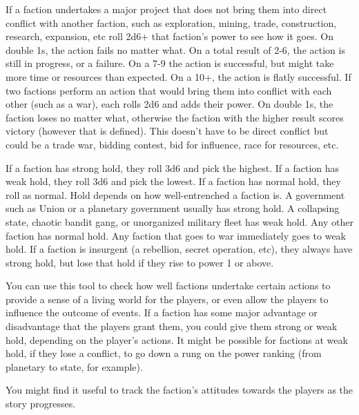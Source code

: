 If a faction undertakes a major project that does not bring them into direct conflict with another
faction, such as exploration, mining, trade, construction, research, expansion, etc roll 2d6+ that
faction's power to see how it goes. On double 1s, the action fails no matter what. On a total result
of 2-6, the action is still in progress, or a failure. On a 7-9 the action is successful, but might take
more time or resources than expected. On a 10+, the action is flatly successful.
If two factions perform an action that would bring them into conflict with each other (such
as a war), each rolls 2d6 and adds their power. On double 1s, the faction loses no matter what,
otherwise the faction with the higher result scores victory (however that is defined). This doesn't
have to be direct conflict but could be a trade war, bidding contest, bid for influence, race for
resources, etc.

If a faction has strong hold, they roll 3d6 and pick the highest. If a faction has weak hold, they roll
3d6 and pick the lowest. If a faction has normal hold, they roll as normal. Hold depends on how
well-entrenched a faction is. A government such as Union or a planetary government usually has
strong hold. A collapsing state, chaotic bandit gang, or unorganized military fleet has weak hold.
Any other faction has normal hold. Any faction that goes to war immediately goes to weak hold. If
a faction is insurgent (a rebellion, secret operation, etc), they always have strong hold, but lose
that hold if they rise to power 1 or above.

You can use this tool to check how well factions undertake certain actions to provide a sense of a
living world for the players, or even allow the players to influence the outcome of events. If a
faction has some major advantage or disadvantage that the players grant them, you could give
them strong or weak hold, depending on the player's actions. It might be possible for factions at
weak hold, if they lose a conflict, to go down a rung on the power ranking (from planetary to state,
for example).

You might find it useful to track the faction's attitudes towards the players as the story progresses.

